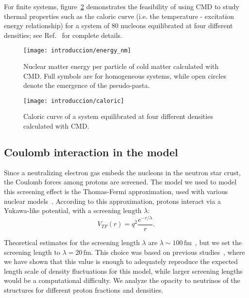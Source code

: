 For finite systems, figure~\ref{fig:caloric} demonstrates the
feasibility of using CMD to study thermal properties such as the
caloric curve (i.e. the temperature - excitation energy relationship)
for a system of 80 nucleons equilibrated at four different densities;
see Ref.~\cite{dorso_isoscaling_2011} for complete details.

\begin{figure}[h]
  \centering
  \texttt{[image: introduccion/energy\_nm]}
  \caption{Nuclear matter energy per particle of cold matter
    calculated with CMD. Full symbols are for homogeneous systems,
    while open circles denote the emergence of the pseudo-pasta.}
  \label{fig:energy_nm}
\end{figure}


\begin{figure}[h]
  \centering
  \texttt{[image: introduccion/caloric]}
  \caption{Caloric curve of a system equilibrated at four different
    densities calculated with CMD.}
  \label{fig:caloric}
\end{figure}


\subsection{Coulomb interaction in the model}\label{sc:coulomb}

Since a neutralizing electron gas embeds the nucleons in the neutron
star crust, the Coulomb forces among protons are screened. The model
we used to model this screening effect is the Thomas-Fermi
approximation, used with various nuclear
models~\cite{maruyama_quantum_1998, dorso_topological_2012,
  horowitz_neutrino-pasta_2004}. According to this approximation,
protons interact via a Yukawa-like potential, with a screening length
$\lambda$:
\begin{equation*}
 V_{TF}(r) = q^2\frac{e^{-r/\lambda}}{r}.
\end{equation*}

Theoretical estimates for the screening length $\lambda$ are
$\lambda\sim100\,\text{fm}$~\cite{fetter_quantum_2003}, but we set the
screening length to $\lambda=20\,\text{fm}$. This choice was based on
previous studies~\cite{alcain_effect_2014}, where we have shown that
this value is enough to adequately reproduce the expected length scale
of density fluctuations for this model, while larger screening lengths
would be a computational difficulty. We analyze the opacity to
neutrinos of the structures for different proton fractions and
densities.

